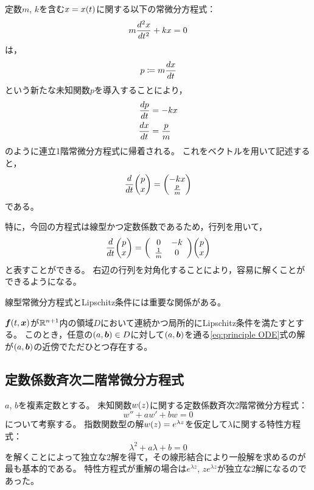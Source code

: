\documentclass[a4paper,draft]{ltjsarticle}
\begin{document}
\begin{eg}
    定数$m$, $k$を含む$x=\fun{x}{t}$に関する以下の常微分方程式：
    \begin{equation}
        m\frac{d^{2} x}{d t^{2}}+kx=0
    \end{equation}
    は，
    \begin{equation}
        p\coloneqq m\frac{d x}{d t}
    \end{equation}
    という新たな未知関数$p$を導入することにより，
    \begin{align}
        \frac{d p}{d t}&=-kx
        \\
        \frac{d x}{d t}&=\dfrac{p}{m}
    \end{align}
    のように連立1階常微分方程式に帰着される。
    これをベクトルを用いて記述すると，
    \begin{equation}
        \diff{}{t}\vctr{p\\x}=\vctr{-kx\\\frac{p}{m}}
    \end{equation}
    である。

    特に，今回の方程式は線型かつ定数係数であるため，行列を用いて，
    \begin{equation}
        \diff{}{t}\vctr{p\\x}=
        \pare{\begin{array}{cc}
            0 & -k
            \\
            \frac{1}{m} & 0
        \end{array}}
        \vctr{p\\x}
    \end{equation}
    と表すことができる。
    右辺の行列を対角化することにより，容易に解くことができるようになる。
\end{eg}

線型常微分方程式とLipschitz条件には重要な関係がある。

\begin{thm}
    $\fun{\bm{f}}{t,\bm{x}}$が$\mathbb{R}^{n+1}$内の領域$D$において連続かつ局所的にLipschitz条件を満たすとする。
    このとき，任意の$\pare{a,\bm{b}}\in D$に対して$\pare{a,\bm{b}}$を通る\eqref{eq:principle ODE}式の解が$\pare{a,\bm{b}}$の近傍でただひとつ存在する。
\end{thm}

\subsection{定数係数斉次二階常微分方程式}\label{subsec:ODE-定数係数}
$a$, $b$を複素定数とする。
未知関数$\fun{w}{z}$に関する定数係数斉次2階常微分方程式：
\begin{equation}
    \label{eq:ODE-定数係数}
    w''+aw'+bw=0
\end{equation}
について考察する。
指数関数型の解$\fun{w}{z}=e^{\lambda z}$を仮定して$\lambda$に関する特性方程式：
\begin{equation}
    \lambda^2+a\lambda+b=0
\end{equation}
を解くことによって独立な2解を得て，その線形結合により一般解を求めるのが最も基本的である。
特性方程式が重解の場合は$e^{\lambda z}$, $ze^{\lambda z}$が独立な2解になるのであった。
\end{document}
